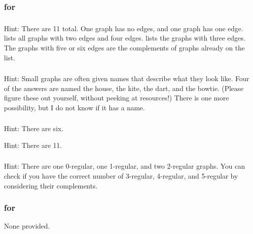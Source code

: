
\subsubsection{\answers for 
\subgraphclassification}

\subsubsection*{ \answers}
    Hint: There are 11 total. One graph has no edges, and one graph has one edge.  lists all graphs with two edges and four edges.   lists the graphs with three edges.  The graphs with five or six edges are the complements of graphs already on the list.

\subsubsection*{ \answers}
    Hint: Small graphs are often given names that describe what they look like.  Four of the answers are named the house, the kite, the dart, and the bowtie.  (Please figure these out yourself, without peeking at resources!) There is one more possibility, but I do not know if it has a name.

\subsubsection*{ \answers}
    \begin{apart}
        \item Hint: There are six.
        \item Hint: There are 11.
    \end{apart}

\subsubsection*{ \answers}
    Hint: There are one 0-regular, one 1-regular, and two 2-regular graphs.  You can check if you have the correct number of 3-regular, 4-regular, and 5-regular by considering their complements.

\subsubsection{\answers for  \subrobots}

None provided.
